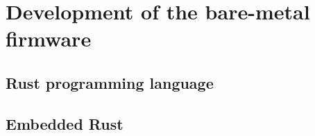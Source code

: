 \section{Development of the bare-metal firmware}
\label{sec:firmware}

\subsection{Rust programming language}
\subsection{Embedded Rust}
